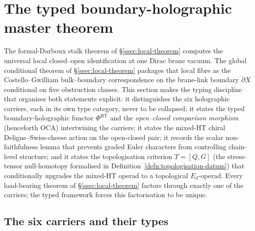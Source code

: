 \section{The typed boundary-holographic master theorem}\label{sec:typed-master}

The formal-Darboux stalk theorem of \S\ref{ssec:local-theorem} computes
the universal local closed--open identification at one Dirac brane
vacuum.  The global conditional theorem of
\S\ref{ssec:local-theorem} packages that local fibre as the
Costello--Gwilliam bulk--boundary correspondence on the brane-link
boundary \(\partial X\) conditional on five obstruction classes.
This section makes the typing discipline that organises both
statements explicit: it distinguishes the six holographic carriers, each
in its own type category, never to be collapsed; it states the typed
boundary-holographic functor \(\Phi^{\mathrm{HT}}\) and the
\emph{open--closed comparison morphism} (henceforth \(\mathrm{OCA}\))
intertwining the carriers; it states the mixed-HT chiral
Deligne--Swiss-cheese action on the open-closed pair; it records the
scalar non-faithfulness lemma that prevents graded Euler characters
from controlling chain-level structure; and it states the
topologisation criterion \(T=[Q,G]\) (the stress-tensor null-homotopy
formalised in Definition~\ref{defn:topologisation-datum}) that
conditionally upgrades the mixed-HT operad to a topological
\(E_d\)-operad.  Every load-bearing theorem of
\S\ref{ssec:local-theorem} factors through exactly one of the
carriers; the typed framework forces this factorisation to be unique.

\subsection{The six carriers and their types}\label{ssec:six-carriers}


